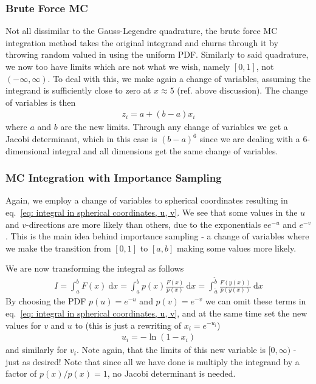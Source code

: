 \documentclass[twoside, 11pt]{article}
\renewcommand{\d}{\mathrm{d}}
\begin{document}
		\subsubsection{Brute Force MC}
			Not all dissimilar to the Gauss-Legendre quadrature, the brute force MC integration method takes the original integrand and churns through it by throwing random valued in using the uniform PDF. Similarly to said quadrature, we now too have limits which are not what we wish, namely $[0, 1]$, not $(-\infty, \infty)$. To deal with this, we make again a change of variables, assuming the integrand is sufficiently close to zero at $x\approx 5$ (ref. above discussion). The change of variables is then
			\begin{align}
				z_i = a + (b-a)x_i
			\end{align}
			where $a$ and $b$ are the new limits. Through any change of variables we get a Jacobi determinant, which in this case is $(b-a)^6$ since we are dealing with a 6-dimensional integral and all dimensions get the same change of variables. 
		
		
		\subsubsection{MC Integration with Importance Sampling}
			Again, we employ a change of variables to spherical coordinates resulting in eq.~\eqref{eq: integral in spherical coordinates, u, v}. We see that some values in the $u$ and $v$-directions are more likely than others, due to the exponentials e$e^{-u}$ and $e^{-v}$. This is the main idea behind importance sampling - a change of variables where we make the transition from $[0, 1]$ to $[a, b]$ making some values more likely.
			
			We are now transforming the integral as follows
			\begin{align}
				I = \int_{a}^{b} F(x) \ \d x = \int_{a}^{b} p(x) \frac{F(x)}{p(x)} \ \d x = \int_{\tilde{a}}^{\tilde{b}} \frac{F(y(x))}{p(y(x))} \ \d x
			\end{align}
			By choosing the PDF $p(u)=e^{-u}$ and $p(v)=e^{-v}$ we can omit these terms in eq.~\eqref{eq: integral in spherical coordinates, u, v}, and at the same time set the new values for $v$ and $u$ to (this is just a rewriting of $x_i=e^{-u_i}$)
			\begin{align*}
				u_i = -\ln (1 - x_i)
			\end{align*}
			and similarly for $v_i$. Note again, that the limits of this new variable is $[0, \infty)$ - just as desired! Note that since all we have done is multiply the integrand by a factor of $p(x)/p(x)=1$, no Jacobi determinant is needed.
			
\end{document}
